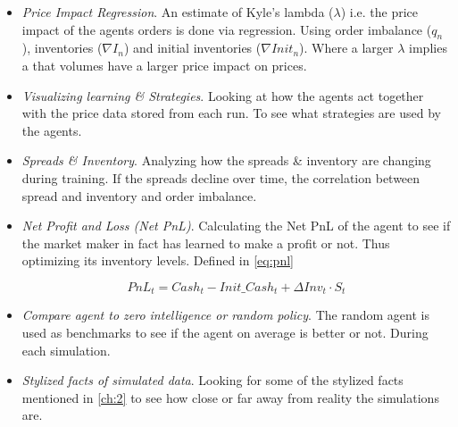\documentclass{kththesis}
\theoremstyle{definition}
\begin{document}
\begin{itemize}
\item \textit{Price Impact Regression}. An estimate of Kyle's lambda ($\lambda$) i.e. the price impact of the agents orders is done via regression. Using order imbalance ($q_n$), inventories ($\nabla I_n$) and initial inventories ($\nabla Init_n$). Where a larger $\lambda$ implies a that volumes have a larger price impact on prices.

\item \textit{Visualizing learning \& Strategies}. Looking at how the agents act together with the price data stored from each run. To see what strategies are used by the agents.
    
\item \textit{Spreads \& Inventory}. Analyzing how the spreads \& inventory are changing during training. If the spreads decline over time, the correlation between spread and inventory and order imbalance.

\item \textit{Net Profit and Loss (Net PnL)}. Calculating the Net PnL of the agent to see if the market maker in fact has learned to make a profit or not. Thus optimizing its inventory levels. Defined in \autoref{eq:pnl}

\begin{equation}
    PnL_{t} = Cash_{t} - Init\_Cash_{t} + \Delta Inv_{t} \cdot S_{t}
    \label{eq:pnl}
\end{equation}

\item \textit{Compare agent to zero intelligence or  random policy}. The random agent is used as benchmarks to see if the agent on average is better or not. During each simulation.

\item \textit{Stylized facts of simulated data}.
Looking for some of the stylized facts mentioned in \autoref{ch:2} to see how close or far away from reality the simulations are.



\end{itemize}
\end{document}
